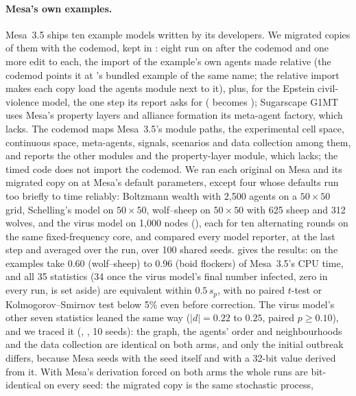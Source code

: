 \paragraph{Mesa's own examples.} Mesa~3.5 ships ten example models written by its
developers. We migrated copies of them with the codemod, kept in
: eight run on \modelly{} after the codemod and one more edit
to each, the import of the example's own agents made relative (the codemod points it at
\modelly{}'s bundled example of the same name; the relative import makes each copy load the
agents module next to it), plus, for the Epstein civil-violence model, the
one step its report asks for ( becomes ); Sugarscape G1MT uses
Mesa's property layers and alliance formation its meta-agent factory, which \modelly{} lacks.
The codemod maps Mesa~3.5's module paths, the experimental cell space, continuous space,
meta-agents, signals, scenarios and data collection among them, and reports the other
 modules and the property-layer module, which \modelly{} lacks; the timed code does not import the
codemod. We ran each original on Mesa and its migrated copy on \modelly{} at Mesa's default
parameters, except four whose defaults run too briefly to time reliably: Boltzmann wealth with
2,500 agents on a $50 \times 50$ grid, Schelling's model on $50 \times 50$, wolf--sheep on
$50 \times 50$ with 625 sheep and 312 wolves, and the virus model on 1,000 nodes
(), each for ten alternating rounds on the same
fixed-frequency core, and compared every model reporter, at the last step and averaged over
the run, over 100 shared seeds.  gives the results: on \modelly{} the
examples take 0.60 (wolf--sheep) to 0.96 (boid flockers) of
Mesa~3.5's CPU time, and all 35 statistics (34 once the virus model's final number infected, zero in every run,
is set aside) are equivalent within $0.5\,s_p$, with no paired $t$-test or
Kolmogorov--Smirnov test below 5\% even before correction. The virus model's other seven
statistics leaned the same way ($|d| = 0.22$ to $0.25$, paired $p \ge 0.10$), and we traced it
(, , 10 seeds): the graph, the
agents' order and neighbourhoods and the data collection are identical on both arms, and only
the initial outbreak differs, because Mesa seeds  with the seed itself and
\modelly{} with a 32-bit value derived from it. With Mesa's derivation forced on both arms the
whole runs are bit-identical on every seed: the migrated copy is the same stochastic process,
